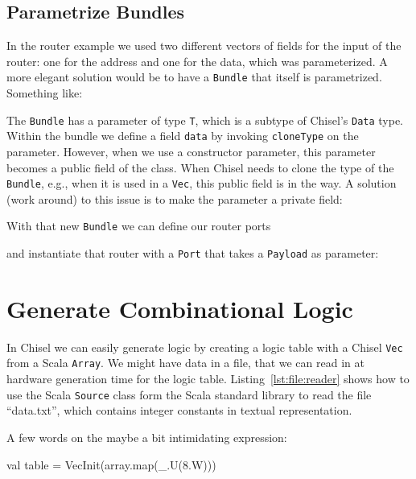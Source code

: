 \documentclass[%
    10pt,
    headinclude, footexclude,
    openright, %
    notitlepage,
    cleardoubleempty,
    headsepline,
    pointlessnumbers,
    bibtotoc, idxtotoc,
    ]{scrbook}
\newcommand{\code}[1]{{\small{\texttt{#1}}}}
\begin{document}

\subsection{Parametrize Bundles}

In the router example we used two different vectors of fields for the input
of the router: one for the address and one for the data, which was parameterized.
A more elegant solution would be to have a \code{Bundle} that itself
is parametrized. Something like:


The \code{Bundle} has a parameter of type \code{T}, which is a subtype
of Chisel's \code{Data} type.
Within the bundle we define a field \code{data} by invoking \code{cloneType}
on the parameter.
However, when we use a constructor parameter, this parameter becomes a
public field of the class. When Chisel needs to clone the type of the \code{Bundle},
e.g., when it is used in a \code{Vec}, this public field is in the way.
A solution (work around) to this issue is to make the parameter a private field:


\noindent With that new \code{Bundle} we can define our router ports


\noindent and instantiate that router with a \code{Port} that takes
a \code{Payload} as parameter:



\section{Generate Combinational Logic}

In Chisel we can easily generate logic by creating a logic table with
a Chisel \code{Vec} from a Scala \code{Array}.
We might have data in a file, that we can read in at hardware generation
time for the logic table.
Listing~\ref{lst:file:reader} shows how to use the Scala \code{Source}
class form the Scala standard library to read the file ``data.txt'', which
contains integer constants in textual representation.

A few words on the maybe a bit intimidating expression:
\begin{chisel}
  val table = VecInit(array.map(_.U(8.W)))
\end{chisel}
\end{document}

